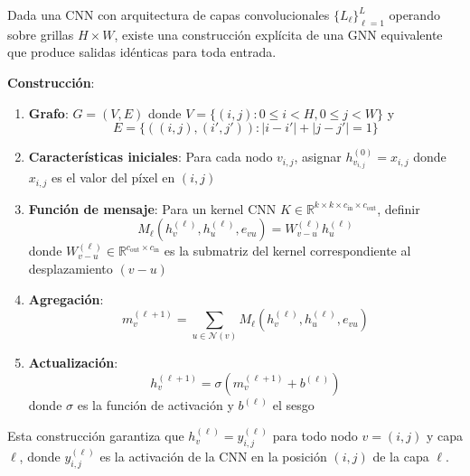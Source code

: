\begin{theorem}\label{thm:equivalencia_constructiva_cnn_gnn}
Dada una CNN con arquitectura de capas convolucionales $\{L_\ell\}_{\ell=1}^L$ operando sobre grillas $H \times W$, existe una construcción explícita de una GNN equivalente que produce salidas idénticas para toda entrada.

\textbf{Construcción}:
\begin{enumerate}
    \item \textbf{Grafo}: $G = (V, E)$ donde $V = \{(i,j) : 0 \leq i < H, 0 \leq j < W\}$ y
    \[
    E = \{((i,j), (i',j')) : |i-i'| + |j-j'| = 1\}
    \]

    \item \textbf{Características iniciales}: Para cada nodo $v_{i,j}$, asignar $h_{v_{i,j}}^{(0)} = x_{i,j}$ donde $x_{i,j}$ es el valor del píxel en $(i,j)$

    \item \textbf{Función de mensaje}: Para un kernel CNN $K \in \mathbb{R}^{k \times k \times c_{\text{in}} \times c_{\text{out}}}$, definir
    \[
    M_\ell(h_v^{(\ell)}, h_u^{(\ell)}, e_{vu}) = W_{v-u}^{(\ell)} h_u^{(\ell)}
    \]
    donde $W_{v-u}^{(\ell)} \in \mathbb{R}^{c_{\text{out}} \times c_{\text{in}}}$ es la submatriz del kernel correspondiente al desplazamiento $(v-u)$

    \item \textbf{Agregación}:
    \[
    m_v^{(\ell+1)} = \sum_{u \in \mathcal{N}(v)} M_\ell(h_v^{(\ell)}, h_u^{(\ell)}, e_{vu})
    \]

    \item \textbf{Actualización}:
    \[
    h_v^{(\ell+1)} = \sigma(m_v^{(\ell+1)} + b^{(\ell)})
    \]
    donde $\sigma$ es la función de activación y $b^{(\ell)}$ el sesgo
\end{enumerate}

Esta construcción garantiza que $h_v^{(\ell)} = y_{i,j}^{(\ell)}$ para todo nodo $v = (i,j)$ y capa $\ell$, donde $y_{i,j}^{(\ell)}$ es la activación de la CNN en la posición $(i,j)$ de la capa $\ell$.
\end{theorem}

